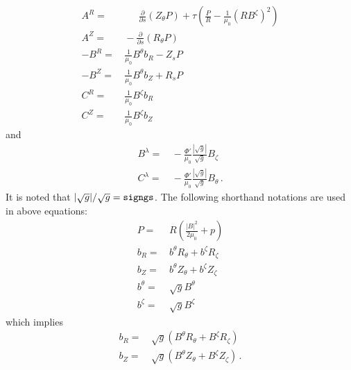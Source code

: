 \begin{align}
 A^R =&\, \phantom{-}~ \frac{\partial}{\partial s} \left( Z_\theta P \right) + \tau \left( \frac{P}{R} - \frac{1}{\mu_0} (R B^\zeta)^2 \right) \label{eqn:f_a_r} \\
 A^Z =&\,          -   \frac{\partial}{\partial s} \left( R_\theta P \right)                                                                   \label{eqn:f_a_z} \\
-B^R =&\, \frac{1}{\mu_0} B^\theta b_R - Z_s P                                                                                                 \label{eqn:f_b_r} \\
-B^Z =&\, \frac{1}{\mu_0} B^\theta b_Z + R_s P                                                                                                 \label{eqn:f_b_z} \\
 C^R =&\, \frac{1}{\mu_0}  B^\zeta b_R                                                                                                         \label{eqn:f_c_r} \\
 C^Z =&\, \frac{1}{\mu_0}  B^\zeta b_Z                                                                                                         \label{eqn:f_c_z}
\end{align}
and
\begin{align}
 B^\lambda =&\, - \frac{\Phi'}{\mu_0} \frac{|\sqrt{g}|}{\sqrt{g}} B_\zeta  \label{eqn:blmn_start} \\
 C^\lambda =&\, - \frac{\Phi'}{\mu_0} \frac{|\sqrt{g}|}{\sqrt{g}} B_\theta \label{eqn:clmn_start} \, .
\end{align}
It is noted that $|\sqrt{g}| / \sqrt{g} = \texttt{signgs}$.
The following shorthand notations are used in above equations:
\begin{align}
 P   =&\, R \left( \frac{|B|^2}{2 \mu_0} + p \right) \label{eqn:r_ptot} \\
 b_R =&\, b^\theta R_\theta + b^\zeta R_\zeta \label{eqn:smallbr} \\
 b_Z =&\, b^\theta Z_\theta + b^\zeta Z_\zeta \\
 b^\theta =&\, \sqrt{g} B^\theta \\
 b^\zeta  =&\, \sqrt{g} B^\zeta \label{eqn:smallbzeta}
\end{align}
which implies
\begin{align}
 b_R =&\, \sqrt{g} \left( B^\theta R_\theta + B^\zeta R_\zeta \right) \\
 b_Z =&\, \sqrt{g} \left( B^\theta Z_\theta + B^\zeta Z_\zeta \right) \, .
\end{align}


